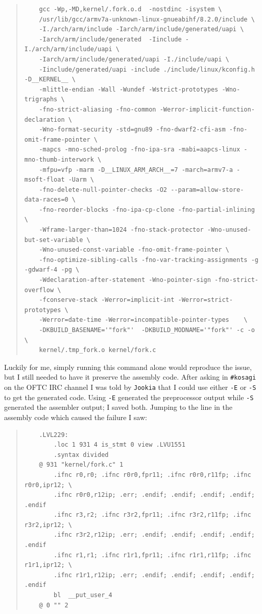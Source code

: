 \documentclass{article}
\begin{document}
\begin{quote}
\begin{verbatim}
	gcc -Wp,-MD,kernel/.fork.o.d  -nostdinc -isystem \
	/usr/lib/gcc/armv7a-unknown-linux-gnueabihf/8.2.0/include \
	-I./arch/arm/include -Iarch/arm/include/generated/uapi \
	-Iarch/arm/include/generated  -Iinclude -I./arch/arm/include/uapi \
	-Iarch/arm/include/generated/uapi -I./include/uapi \
	-Iinclude/generated/uapi -include ./include/linux/kconfig.h -D__KERNEL__ \
	-mlittle-endian -Wall -Wundef -Wstrict-prototypes -Wno-trigraphs \
	-fno-strict-aliasing -fno-common -Werror-implicit-function-declaration \
	-Wno-format-security -std=gnu89 -fno-dwarf2-cfi-asm -fno-omit-frame-pointer \
	-mapcs -mno-sched-prolog -fno-ipa-sra -mabi=aapcs-linux -mno-thumb-interwork \
	-mfpu=vfp -marm -D__LINUX_ARM_ARCH__=7 -march=armv7-a -msoft-float -Uarm \
	-fno-delete-null-pointer-checks -O2 --param=allow-store-data-races=0 \
	-fno-reorder-blocks -fno-ipa-cp-clone -fno-partial-inlining \
	-Wframe-larger-than=1024 -fno-stack-protector -Wno-unused-but-set-variable \
	-Wno-unused-const-variable -fno-omit-frame-pointer \
	-fno-optimize-sibling-calls -fno-var-tracking-assignments -g -gdwarf-4 -pg \
	-Wdeclaration-after-statement -Wno-pointer-sign -fno-strict-overflow \
	-fconserve-stack -Werror=implicit-int -Werror=strict-prototypes \
	-Werror=date-time -Werror=incompatible-pointer-types    \
	-DKBUILD_BASENAME='"fork"'  -DKBUILD_MODNAME='"fork"' -c -o \
	kernel/.tmp_fork.o kernel/fork.c
\end{verbatim}
\end{quote}

Luckily for me, simply running this command alone would reproduce the issue, but I still needed to have it preserve the assembly code.  After asking in \texttt{#kosagi} on the OFTC IRC channel I was told by \texttt{Jookia} that I could use either \texttt{-E} or \texttt{-S} to get the generated code.  Using \texttt{-E} generated the preprocessor output while \texttt{-S} generated the assembler output; I saved both.  Jumping to the line in the assembly code which caused the failure I saw:

\begin{quote}
\begin{verbatim}
	.LVL229:
		.loc 1 931 4 is_stmt 0 view .LVU1551
		.syntax divided
	@ 931 "kernel/fork.c" 1
		.ifnc r0,r0; .ifnc r0r0,fpr11; .ifnc r0r0,r11fp; .ifnc r0r0,ipr12; \
		.ifnc r0r0,r12ip; .err; .endif; .endif; .endif; .endif; .endif
		.ifnc r3,r2; .ifnc r3r2,fpr11; .ifnc r3r2,r11fp; .ifnc r3r2,ipr12; \
		.ifnc r3r2,r12ip; .err; .endif; .endif; .endif; .endif; .endif
		.ifnc r1,r1; .ifnc r1r1,fpr11; .ifnc r1r1,r11fp; .ifnc r1r1,ipr12; \
		.ifnc r1r1,r12ip; .err; .endif; .endif; .endif; .endif; .endif
		bl	__put_user_4
	@ 0 "" 2
\end{verbatim}
\end{quote}
\end{document}
